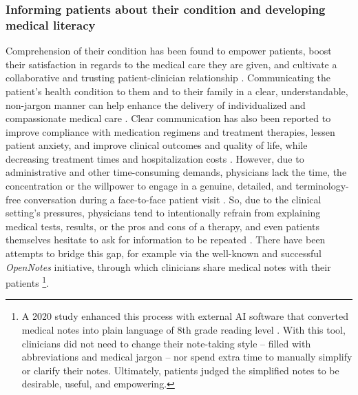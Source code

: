 \subsubsection{Informing patients about their condition and developing medical literacy}\label{SafetyRisks}
Comprehension of their condition has been found to empower patients, boost their satisfaction in regards to the medical care they are given, and cultivate a collaborative and trusting patient-clinician relationship \cite{simplifiedmednotes2020, patientsreaddocnotes2012}. Communicating the patient's health condition to them and to their family in a clear, understandable, non-jargon manner can help enhance the delivery of individualized and compassionate medical care \cite{chaGPTpassesUSMLE2023}. Clear communication has also been reported to improve compliance with medication regimens and treatment therapies, lessen patient anxiety, and improve clinical outcomes and quality of life, while decreasing treatment times and hospitalization costs \cite{patienteducation2006, educatepatientsandfam2014}. However, due to administrative and other time-consuming demands, physicians lack the time, the concentration or the willpower to engage in a genuine, detailed, and terminology-free conversation during a face-to-face patient visit \cite{educatepatientsandfam2014}. So, due to the clinical setting's pressures, physicians tend to intentionally refrain from explaining medical tests, results, or the pros and cons of a therapy, and even patients themselves hesitate to ask for information to be repeated \cite{BickmoreGiorgino2006}. There have been attempts to bridge this gap, for example via the well-known and successful \textit{OpenNotes} initiative, through which clinicians share medical notes with their patients \footnote{A 2020 study enhanced this process with external AI software that converted medical notes into plain language of 8th grade reading level \cite{simplifiedmednotes2020}. With this tool, clinicians did not need to change their note-taking style -- filled with abbreviations and medical jargon -- nor spend extra time to manually simplify or clarify their notes. Ultimately, patients judged the simplified notes to be desirable, useful, and empowering.}.

